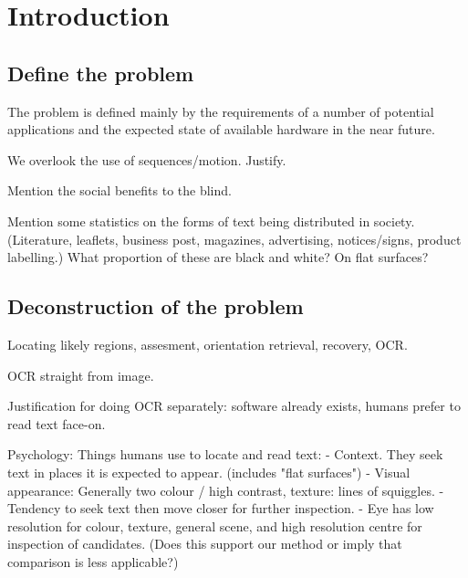 



\chapter{Introduction}




\section{Define the problem} %

The problem is defined mainly by the requirements of a number of potential applications and the expected state of available hardware in the near future.

We overlook the use of sequences/motion.  Justify.

Mention the social benefits to the blind.

Mention some statistics on the forms of text being distributed in society.
  (Literature, leaflets, business post, magazines, advertising, notices/signs, product labelling.)
	What proportion of these are black and white?  On flat surfaces?



\section{Deconstruction of the problem} %

Locating likely regions, assesment, orientation retrieval, recovery, OCR.

OCR straight from image.

Justification for doing OCR separately: software already exists, humans prefer to read text face-on.

Psychology:  Things humans use to locate and read text:
	- Context.  They seek text in places it is expected to appear.  (includes "flat surfaces")
	- Visual appearance:  Generally two colour / high contrast, texture: lines of squiggles.
	- Tendency to seek text then move closer for further inspection.
	- Eye has low resolution for colour, texture, general scene, and high resolution centre for inspection of candidates.  (Does this support our method or imply that comparison is less applicable?)

